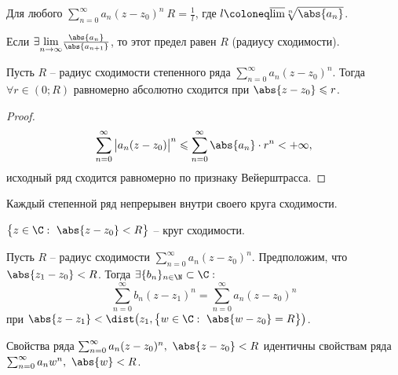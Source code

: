 

\begin{corollary}
	Для любого $\sum_{n=0}^{\infty}a_n(z-z_0)^n \ R = \frac{1}{l} $, где $l \coloneq \overline{\lim} \sqrt[n]{\abs{a_n} } $.
\end{corollary}

\begin{remark}
	Если $\exists \underset{n \rightarrow \infty }{\lim} \frac{\abs{a_n} }{\abs{a_{n+1} } } $, то этот предел равен $R$ (радиусу сходимости).
\end{remark}

\begin{theorem}
	Пусть $R$ -- радиус сходимости степенного ряда $\sum_{n=0}^{\infty } a_n(z-z_0)^n$. Тогда $\forall r \in (0 ; R )$ равномерно абсолютно сходится при $\abs{z - z_0} \leqslant r$.
\end{theorem}

\begin{proof}
	\[
		\sum_{n=0}^{\infty }\big|a_n(z-z_0)\big|^n \leqslant \sum_{n=0}^{\infty } \abs{a_n} \cdot r^n < +\infty,
	\]
	исходный ряд сходится равномерно по признаку Вейерштрасса.
\end{proof}

\begin{corollary}
	Каждый степенной ряд непрерывен внутри своего круга сходимости.
\end{corollary}

\begin{note}
	$\big\{z \in \C: \ \abs{z - z_0} < R\big\}$ -- круг сходимости.
\end{note}

\begin{theorem}
	Пусть $R$ -- радиус сходимости $\sum_{n=0}^{\infty } a_n(z-z_0)^n$. Предположим, что $\abs{z_1 - z_0} < R$. Тогда $\exists \{b_n\}_{n\in\N} \subset \C:$
	\[
		\sum_{n=0}^{\infty } b_n(z-z_1)^n = \sum_{n=0}^{\infty } a_n(z-z_0)^n
	\]
	при $\abs{z-z_1} < \dist \big(z_1,\big\{w \in \C: \ \abs{w - z_0} =R\big\}\big)$.
	\begin{figure}[H]
		\centering
		\label{fig:fig-10}
	\end{figure}
\end{theorem}

\begin{remark}
	Свойства ряда $\sum_{n=0}^{\infty } a_n(z-z_0)^n, \ \abs{z-z_0} <R$ идентичны свойствам ряда $\sum_{n=0}^{\infty } a_nw^n, \ \abs{w} <R$.
\end{remark}

